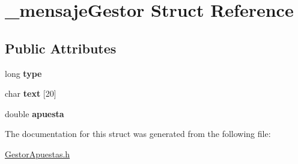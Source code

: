 \hypertarget{struct__mensajeGestor}{}\section{\+\_\+mensaje\+Gestor Struct Reference}
\label{struct__mensajeGestor}
\subsection*{Public Attributes}
\begin{DoxyCompactItemize}
\item 
long {\bfseries type}\hypertarget{struct__mensajeGestor_a6123bba2cac951bcfc5600e9667f9611}{}\label{struct__mensajeGestor_a6123bba2cac951bcfc5600e9667f9611}

\item 
char {\bfseries text} \mbox{[}20\mbox{]}\hypertarget{struct__mensajeGestor_ab52880009b37225fa72f5c28eddcfd08}{}\label{struct__mensajeGestor_ab52880009b37225fa72f5c28eddcfd08}

\item 
double {\bfseries apuesta}\hypertarget{struct__mensajeGestor_abdcd5908e35f43c406fd6c8ff33c3a92}{}\label{struct__mensajeGestor_abdcd5908e35f43c406fd6c8ff33c3a92}

\end{DoxyCompactItemize}


The documentation for this struct was generated from the following file\+:\begin{DoxyCompactItemize}
\item 
\hyperlink{GestorApuestas_8h}{Gestor\+Apuestas.\+h}\end{DoxyCompactItemize}
